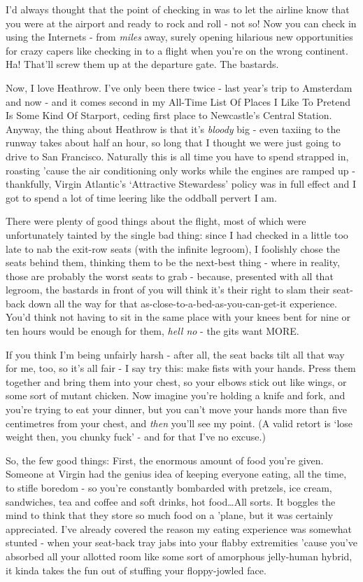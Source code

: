 \documentclass[a5paper,titlepage,draft]{book}
\begin{document}
I'd always thought that the point of checking in was to let the airline know that you were at the airport and ready to rock and roll - not so!  Now you can check in using the Internets - from \emph{miles} away, surely opening hilarious new opportunities for crazy capers like checking in to a flight when you're on the wrong continent.  Ha!  That'll screw them up at the departure gate.  The bastards.

Now, I love Heathrow.  I've only been there twice - last year's trip to Amsterdam and now - and it comes second in my All-Time List Of Places I Like To Pretend Is Some Kind Of Starport, ceding first place to Newcastle's Central Station.  Anyway, the thing about Heathrow is that it's \emph{bloody} big - even taxiing to the runway takes about half an hour, so long that I thought we were just going to drive to San Francisco.  Naturally this is all time you have to spend strapped in, roasting 'cause the air conditioning only works while the engines are ramped up - thankfully, Virgin Atlantic's `Attractive Stewardess' policy was in full effect and I got to spend a lot of time leering like the oddball pervert I am.

There were plenty of good things about the flight, most of which were unfortunately tainted by the single bad thing: since I had checked in a little too late to nab the exit-row seats (with the infinite legroom), I foolishly chose the seats behind them, thinking them to be the next-best thing - where in reality, those are probably the worst seats to grab - because, presented with all that legroom, the bastards in front of you will think it's their right to slam their seat-back down all the way for that as-close-to-a-bed-as-you-can-get-it experience.  You'd think not having to sit in the same place with your knees bent for nine or ten hours would be enough for them, \emph{hell no} - the gits want MORE.

If you think I'm being unfairly harsh - after all, the seat backs tilt all that way for me, too, so it's all fair - I say try this:  make fists with your hands.  Press them together and bring them into your chest, so your elbows stick out like wings, or some sort of mutant chicken.  Now imagine you're holding a knife and fork, and you're trying to eat your dinner, but you can't move your hands more than five centimetres from your chest, and \emph{then} you'll see my point.  (A valid retort is `lose weight then, you chunky fuck' - and for that I've no excuse.)

So, the few good things:  First, the enormous amount of food you're given.  Someone at Virgin had the genius idea of keeping everyone eating, all the time, to stifle boredom - so you're constantly bombarded with pretzels, ice cream, sandwiches, tea and coffee and soft drinks, hot food\ldots  All sorts.  It boggles the mind to think that they store so much food on a 'plane, but it was certainly appreciated.  I've already covered the reason my eating experience was somewhat stunted - when your seat-back tray jabs into your flabby extremities 'cause you've absorbed all your allotted room like some sort of amorphous jelly-human hybrid, it kinda takes the fun out of stuffing your floppy-jowled face.
\end{document}
